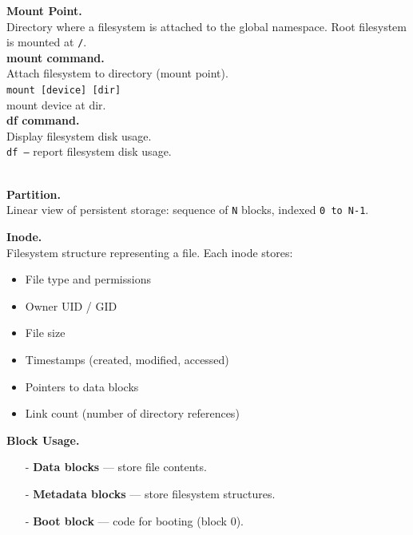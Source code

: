 \documentclass[8pt]{extarticle}
\begin{document}
\begin{minipage}[htp]{0.5\textwidth}
\begin{minipage}[t]{0.49\textwidth}
\begin{enumerate}[noitemsep,nolistsep,topsep=-10px,partopsep=0pt,parsep=0pt]
    \end{enumerate}
\end{minipage}
\hfill
\begin{minipage}[t]{0.49\textwidth}
    \noindent\textbf{Mount Point.} \\
Directory where a filesystem is attached to the global namespace. Root filesystem is mounted at \texttt{/}.\\
\textbf{mount command.} \\
Attach filesystem to directory (mount point).\\
\texttt{mount [device] [dir]} \\ mount device at dir.\\
\textbf{df command.} \\
Display filesystem disk usage.\\
\texttt{df --} report filesystem disk usage.\\
\end{minipage}\\[5px]
\noindent\textbf{Partition.} \\
Linear view of persistent storage: sequence of \texttt{N} blocks, indexed \texttt{0 to N-1}. \\
\begin{minipage}[t]{0.4\textwidth}
    \noindent\textbf{Inode.} \\
    Filesystem structure representing a file. Each inode stores:
    \begin{itemize}[noitemsep,topsep=0pt]
        \item File type and permissions
        \item Owner UID / GID
        \item File size
        \item Timestamps (created, modified, accessed)
        \item Pointers to data blocks
        \item Link count (number of directory references)
    \end{itemize}
\end{minipage}
\begin{minipage}[t]{0.55\textwidth}
\noindent\textbf{Block Usage.}
\begin{itemize}[noitemsep,topsep=0pt]
    \item[-] \textbf{Data blocks} — store file contents.
    \item[-] \textbf{Metadata blocks} — store filesystem structures.
    \item[-] \textbf{Boot block} — code for booting (block 0).

\end{itemize}
\end{minipage}
\end{minipage}
\end{document}
